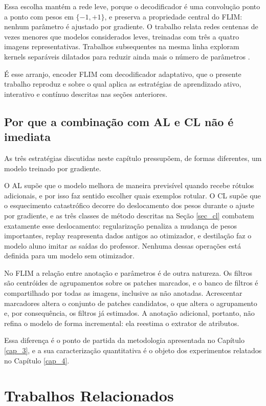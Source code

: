 Essa escolha mantém a rede leve, porque o decodificador é uma convolução ponto a ponto com pesos em $\{-1, +1\}$, e preserva a propriedade central do \ac{FLIM}: nenhum parâmetro é ajustado por gradiente. O trabalho relata redes centenas de vezes menores que modelos considerados leves, treinadas com três a quatro imagens representativas. Trabalhos subsequentes na mesma linha exploram kernels separáveis dilatados para reduzir ainda mais o número de parâmetros \cite{joao2025flyweight}.

É esse arranjo, encoder \ac{FLIM} com decodificador adaptativo, que o presente trabalho reproduz e sobre o qual aplica as estratégias de aprendizado ativo, interativo e contínuo descritas nas seções anteriores.

\subsection{Por que a combinação com AL e CL não é imediata}

As três estratégias discutidas neste capítulo pressupõem, de formas diferentes, um modelo treinado por gradiente.

O \ac{AL} supõe que o modelo melhora de maneira previsível quando recebe rótulos adicionais, e por isso faz sentido escolher quais exemplos rotular. O \ac{CL} supõe que o esquecimento catastrófico decorre do deslocamento dos pesos durante o ajuste por gradiente, e as três classes de método descritas na Seção \ref{sec_cl} combatem exatamente esse deslocamento: regularização penaliza a mudança de pesos importantes, replay reapresenta dados antigos ao otimizador, e destilação faz o modelo aluno imitar as saídas do professor. Nenhuma dessas operações está definida para um modelo sem otimizador.

No \ac{FLIM} a relação entre anotação e parâmetros é de outra natureza. Os filtros são centróides de agrupamentos sobre os patches marcados, e o banco de filtros é compartilhado por todas as imagens, inclusive as não anotadas. Acrescentar marcadores altera o conjunto de patches candidatos, o que altera o agrupamento e, por consequência, os filtros já estimados. A anotação adicional, portanto, não refina o modelo de forma incremental: ela reestima o extrator de atributos.

Essa diferença é o ponto de partida da metodologia apresentada no Capítulo \ref{cap_3}, e a sua caracterização quantitativa é o objeto dos experimentos relatados no Capítulo \ref{cap_4}.


\section{Trabalhos Relacionados}

